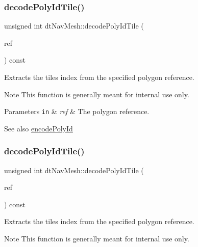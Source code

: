 \subsubsection{\texorpdfstring{decode\+Poly\+Id\+Tile()}{decodePolyIdTile()}\hspace{0.1cm}{\footnotesize\ttfamily [1/2]}}
{\footnotesize\ttfamily unsigned int dt\+Nav\+Mesh\+::decode\+Poly\+Id\+Tile (\begin{DoxyParamCaption}\item[{\hyperlink{group__detour_gab4e0b2257a670c1a800057999612b466}{dt\+Poly\+Ref}}]{ref }\end{DoxyParamCaption}) const\hspace{0.3cm}{\ttfamily [inline]}}

Extracts the tile\textquotesingle{}s index from the specified polygon reference. \begin{DoxyNote}{Note}
This function is generally meant for internal use only. 
\end{DoxyNote}

\begin{DoxyParams}[1]{Parameters}
\mbox{\tt in}  & {\em ref} & The polygon reference. \\
\hline
\end{DoxyParams}
\begin{DoxySeeAlso}{See also}
\hyperlink{classdtNavMesh_a168a479840e7e32613f4b68ee4662d78}{encode\+Poly\+Id} 
\end{DoxySeeAlso}
\mbox{\label{classdtNavMesh_a94cfcf0015d7d6d856acaf96126cd349}} 
\subsubsection{\texorpdfstring{decode\+Poly\+Id\+Tile()}{decodePolyIdTile()}\hspace{0.1cm}{\footnotesize\ttfamily [2/2]}}
{\footnotesize\ttfamily unsigned int dt\+Nav\+Mesh\+::decode\+Poly\+Id\+Tile (\begin{DoxyParamCaption}\item[{\hyperlink{group__detour_gab4e0b2257a670c1a800057999612b466}{dt\+Poly\+Ref}}]{ref }\end{DoxyParamCaption}) const\hspace{0.3cm}{\ttfamily [inline]}}

Extracts the tile\textquotesingle{}s index from the specified polygon reference. \begin{DoxyNote}{Note}
This function is generally meant for internal use only. 
\end{DoxyNote}

